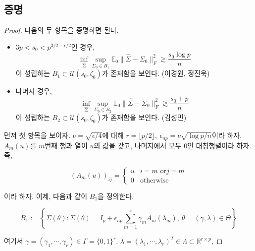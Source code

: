 \subsection{증명}

\begin{proof}

다음의 두 항목을 증명하면 된다. 

\begin{itemize}
    \item $3p < s_0 < p^{3/2 - \epsilon/2}$인 경우,
    \begin{equation}\label{eqn-13} 
        \inf_{\hat{\Sigma}}\sup_{\Sigma_0 \in B_1} \mathbb{E}_0 \lVert\hat{\Sigma} - \Sigma_0 \rVert_F^2 \gtrsim \frac{s_0 \log p}{n} 
    \end{equation}
    이 성립하는 $B_1 \subset \mathcal{U}(s_0, \zeta_0)$가 존재함을 보인다. (이경원, 정진욱)
\item 나머지 경우,
    \begin{equation}\label{eqn-14} \inf_{\hat{\Sigma}}\sup_{\Sigma_0 \in B_2} \mathbb{E}_0 \lVert\hat{\Sigma} - \Sigma_0 \rVert_F^2 \gtrsim \frac{s_0 + p}{n}
    \end{equation}
    이 성립하는 $B_2 \subset \mathcal{U}(s_0, \zeta_0)$가 존재함을 보인다. (김성민)
\end{itemize}

먼저 첫 항목을 보이자. $\nu = \sqrt{\epsilon/4}$에 대해 $r = \lfloor p/2 \rfloor,~\epsilon_{np} = \nu \sqrt{\log p / n}$이라 하자. $A_m(u)$를 $m$번째 행과 열이 $u$의 값을 갖고, 나머지에서 모두 0인 대칭행렬이라 하자. 즉, 

\begin{equation*}
    (A_m(u))_{ij} = \begin{cases} u & i = m \text{ or} j = m \\ 0 & \text{otherwise} \end{cases}
\end{equation*}

이라 하자. 이제, 다음과 같이 $B_1$을 정의한다.

\begin{equation*}
    B_1 := \left\{ \Sigma(\theta) : \Sigma(\theta) = I_p + \epsilon_{np} \sum_{m=1}^r \gamma_m A_m(\lambda_m),~\theta = (\gamma, \lambda) \in \Theta \right\}
\end{equation*}

여기서 $\gamma = (\gamma_1,\cdots, \gamma_r) \in \Gamma = \{0, 1\}^r$, $\lambda = (\lambda_1, \cdots, \lambda_r)^T \in \Lambda \subset \mathbb{R}^{r \times p}$,


\end{proof}
